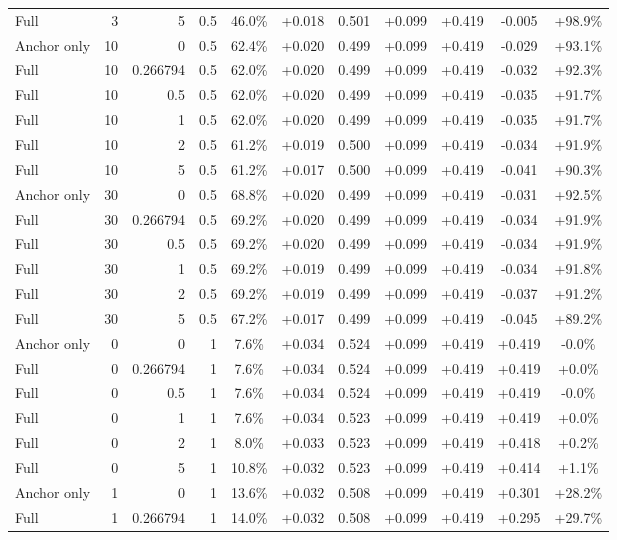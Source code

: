 \begin{table}[htbp]
\begin{tabular}{lrrrccccccc}
Full & 3 & 5 & 0.5 & 46.0\% & +0.018 & 0.501 & +0.099 & +0.419 & -0.005 & +98.9\% \\
Anchor only & 10 & 0 & 0.5 & 62.4\% & +0.020 & 0.499 & +0.099 & +0.419 & -0.029 & +93.1\% \\
Full & 10 & 0.266794 & 0.5 & 62.0\% & +0.020 & 0.499 & +0.099 & +0.419 & -0.032 & +92.3\% \\
Full & 10 & 0.5 & 0.5 & 62.0\% & +0.020 & 0.499 & +0.099 & +0.419 & -0.035 & +91.7\% \\
Full & 10 & 1 & 0.5 & 62.0\% & +0.020 & 0.499 & +0.099 & +0.419 & -0.035 & +91.7\% \\
Full & 10 & 2 & 0.5 & 61.2\% & +0.019 & 0.500 & +0.099 & +0.419 & -0.034 & +91.9\% \\
Full & 10 & 5 & 0.5 & 61.2\% & +0.017 & 0.500 & +0.099 & +0.419 & -0.041 & +90.3\% \\
Anchor only & 30 & 0 & 0.5 & 68.8\% & +0.020 & 0.499 & +0.099 & +0.419 & -0.031 & +92.5\% \\
Full & 30 & 0.266794 & 0.5 & 69.2\% & +0.020 & 0.499 & +0.099 & +0.419 & -0.034 & +91.9\% \\
Full & 30 & 0.5 & 0.5 & 69.2\% & +0.020 & 0.499 & +0.099 & +0.419 & -0.034 & +91.9\% \\
Full & 30 & 1 & 0.5 & 69.2\% & +0.019 & 0.499 & +0.099 & +0.419 & -0.034 & +91.8\% \\
Full & 30 & 2 & 0.5 & 69.2\% & +0.019 & 0.499 & +0.099 & +0.419 & -0.037 & +91.2\% \\
Full & 30 & 5 & 0.5 & 67.2\% & +0.017 & 0.499 & +0.099 & +0.419 & -0.045 & +89.2\% \\
Anchor only & 0 & 0 & 1 & 7.6\% & +0.034 & 0.524 & +0.099 & +0.419 & +0.419 & -0.0\% \\
Full & 0 & 0.266794 & 1 & 7.6\% & +0.034 & 0.524 & +0.099 & +0.419 & +0.419 & +0.0\% \\
Full & 0 & 0.5 & 1 & 7.6\% & +0.034 & 0.524 & +0.099 & +0.419 & +0.419 & -0.0\% \\
Full & 0 & 1 & 1 & 7.6\% & +0.034 & 0.523 & +0.099 & +0.419 & +0.419 & +0.0\% \\
Full & 0 & 2 & 1 & 8.0\% & +0.033 & 0.523 & +0.099 & +0.419 & +0.418 & +0.2\% \\
Full & 0 & 5 & 1 & 10.8\% & +0.032 & 0.523 & +0.099 & +0.419 & +0.414 & +1.1\% \\
Anchor only & 1 & 0 & 1 & 13.6\% & +0.032 & 0.508 & +0.099 & +0.419 & +0.301 & +28.2\% \\
Full & 1 & 0.266794 & 1 & 14.0\% & +0.032 & 0.508 & +0.099 & +0.419 & +0.295 & +29.7\% \\

\end{tabular}
\end{table}
